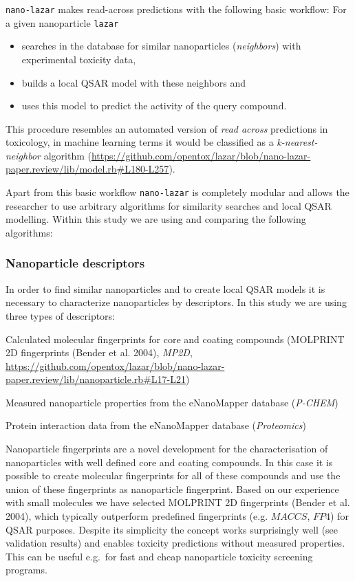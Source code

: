 \documentclass[utf8]{frontiersHLTH} %
\makeatletter
\providecommand{\tightlist}{%
  \setlength{\itemsep}{0pt}\setlength{\parskip}{0pt}}
\newenvironment{description}
	{\list{}{\labelwidth\z@ \itemindent-\leftmargin
		\let\makelabel\descriptionlabel}}
	{\endlist}
\newcommand*\descriptionlabel[1]{\hspace\labelsep
	\normalfont\bfseries #1}
\makeatother
\begin{document}
\texttt{nano-lazar} makes read-across predictions with the following
basic workflow: For a given nanoparticle \texttt{lazar}

\begin{itemize}
\tightlist
\item
  searches in the database for similar nanoparticles (\emph{neighbors})
  with experimental toxicity data,
\item
  builds a local QSAR model with these neighbors and
\item
  uses this model to predict the activity of the query compound.
\end{itemize}

This procedure resembles an automated version of \emph{read across}
predictions in toxicology, in machine learning terms it would be
classified as a \emph{k-nearest-neighbor} algorithm
(\url{https://github.com/opentox/lazar/blob/nano-lazar-paper.review/lib/model.rb\#L180-L257}).

Apart from this basic workflow \texttt{nano-lazar} is completely modular
and allows the researcher to use arbitrary algorithms for similarity
searches and local QSAR modelling. Within this study we are using and
comparing the following algorithms:

\subsubsection{Nanoparticle descriptors}\label{nanoparticle-descriptors}

In order to find similar nanoparticles and to create local QSAR models
it is necessary to characterize nanoparticles by descriptors. In this
study we are using three types of descriptors:

\begin{description}
\tightlist
\item[Structural descriptors]
Calculated molecular fingerprints for core and coating compounds
(MOLPRINT 2D fingerprints (Bender et al. 2004), \emph{MP2D},
\url{https://github.com/opentox/lazar/blob/nano-lazar-paper.review/lib/nanoparticle.rb\#L17-L21})
\item[Physico-chemical nanoparticle properties]
Measured nanoparticle properties from the eNanoMapper database
(\emph{P-CHEM})
\item[Biological nanoparticle properties]
Protein interaction data from the eNanoMapper database
(\emph{Proteomics})
\end{description}

Nanoparticle fingerprints are a novel development for the
characterisation of nanoparticles with well defined core and coating
compounds. In this case it is possible to create molecular fingerprints
for all of these compounds and use the union of these fingerprints as
nanoparticle fingerprint. Based on our experience with small molecules
we have selected MOLPRINT 2D fingerprints (Bender et al. 2004), which
typically outperform predefined fingerprints (e.g. \(MACCS\), \(FP4\))
for QSAR purposes. Despite its simplicity the concept works surprisingly
well (see validation results) and enables toxicity predictions without
measured properties. This can be useful e.g.~for fast and cheap
nanoparticle toxicity screening programs.
\end{document}
